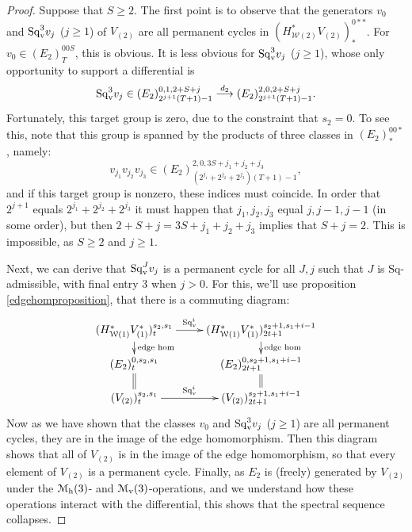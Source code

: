 \documentclass[11pt]{amsart}
\theoremstyle{plain}
\theoremstyle{definition}
\renewcommand{\to}{\longrightarrow}
\newcommand{\calW}{\mathcal{W}}
\newcommand{\calmv}{\mathcal{M}_\textup{v}}
\newcommand{\calmh}{\mathcal{M}_\textup{h}}
\theoremstyle{plain}
\newcommand{\Sq}{\mathrm{Sq}}
\newcommand{\Sqv}{\mathrm{Sq}_\textup{v}}
\begin{document}
\begin{Calculations of HWn for n nonzero}
\begin{proof}
Suppose that $S\geq2$. The first point is to observe that the generators $v_0$ and $\Sqv^3v_j$ ($j\geq1$) of $V_{(2)}$ are all permanent cycles in
$(H^{*}_{\calW(2)}V_{(2)})^{0**}_{*}$. For $v_0\in (E_2)^{00S}_{T}$, this is obvious. It is less obvious for $\Sqv^3v_j$ ($j\geq1$), whose only opportunity to support a differential is
\[\Sqv^3v_j\in (E_2)^{0,1,2+S+j}_{2^{j+1}(T+1)-1}\overset{d_2}{\to}(E_2)^{2,0,2+S+j}_{2^{j+1}(T+1)-1}.\]
Fortunately, this target group is zero, due to the constraint that $s_2=0$. To see this, note that this group is spanned by the products of three classes in $(E_{2})^{00*}_*$, namely:
\[v_{j_1}v_{j_2}v_{j_3}\in (E_{2})^{2,0,3S+j_1+j_2+j_3}_{(2^{j_1}+2^{j_2}+2^{j_3})(T+1)-1},\]
and if this target group is nonzero, these indices must coincide.
In order that $2^{j+1}$ equals $2^{j_{1}}+2^{j_{2}}+2^{j_{3}}$ it must happen that $j_1,j_2,j_3$ equal $j,j-1,j-1$ (in some order), but then $2+S+j=3S+j_1+j_2+j_3$ implies that $S+j=2$. This is impossible, as $S\geq2$ and $j\geq1$.

Next, we can derive that $\Sqv^Jv_j$ is a permanent cycle for all $J,j$ such that $J$ is $\Sq$-admissible, with final entry 3 when $j>0$. For this, we'll use  proposition \ref{edgehomproposition}, that there is a commuting diagram:%
\[\xymatrix@R=4mm{
(H^*_{\calW(1)}V_{(1)}^*)^{s_{2},s_1}_t\ar[r]^-{\Sq_\textup{v}^i}
\ar[d]^-{\textup{edge hom}}
&%
(H^*_{\calW(1)}V_{(1)}^*)^{s_{2}+1,s_1+i-1}_{2t+1}\ar[d]^-{\textup{edge hom}}
\\%
(E_{2})^{0,s_{2},s_1}_t\ar@{=}[d]%
&%
(E_2)^{0,s_{2}+1,s_1+i-1}_{2t+1}\ar@{=}[d]\\
(V_{(2)})^{s_{2},s_1}_t\ar[r]^-{\Sq_\textup{v}^i}
&%
(V_{(2)})^{s_{2}+1,s_1+i-1}_{2t+1}
}\]
Now as we have shown that the classes $v_0$ and $\Sqv^{3}v_j$  ($j\geq1$) are all permanent cycles, they are in the image of the edge homomorphism. Then this diagram shows that all of $V_{(2)}$ is in the image of the edge homomorphism, so that every element  of $V_{(2)}$ is a permanent cycle. Finally, as $E_{2}$ is (freely) generated by $V_{(2)}$ under the $\calmh(3)$- and $\calmv(3)$-operations, and we understand how these operations interact with the differential, this shows that the spectral sequence collapses.


\end{proof}
\end{Calculations of HWn for n nonzero}
\end{document}
